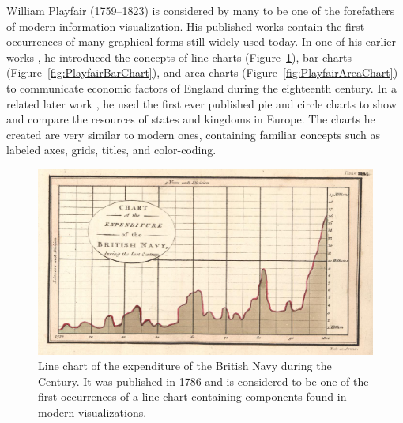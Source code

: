 William Playfair (1759--1823) is considered by many to be one of the
forefathers of modern information visualization. His published works
contain the first occurrences of many graphical forms still widely
used today. In one of his earlier works
\parencite{CommercialAndPoliticalAtlas}, he introduced the concepts of
line charts (Figure~\ref{fig:PlayfairLineChart}), bar charts
(Figure~\ref{fig:PlayfairBarChart}), and area charts
(Figure~\ref{fig:PlayfairAreaChart}) to communicate economic factors
of England during the eighteenth century. In a related later work
\parencite{StatisticalBreviary}, he used the first ever published pie
and circle charts to show and compare the resources of states and
kingdoms in Europe. The charts he created are very similar to modern
ones, containing familiar concepts such as labeled axes, grids,
titles, and color-coding.



\begin{figure}[tp]
\centering
\includegraphics[keepaspectratio,width=\linewidth,height=\thirdh]
{images/playfair-line-chart.png}
\caption[Line Chart by William Playfair from 1786]{%
Line chart of the expenditure of the British Navy during the 
Century. It was published in 1786 and is considered to be one of the
first occurrences of a line chart containing components found in
modern visualizations. }
\label{fig:PlayfairLineChart}
\end{figure}



